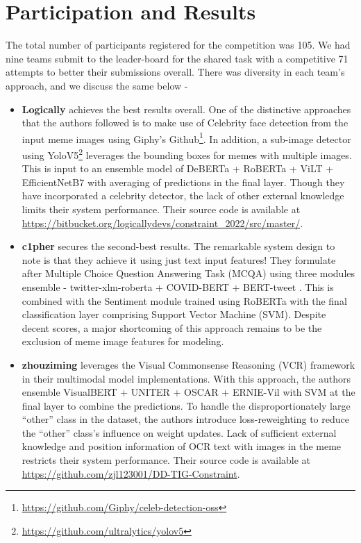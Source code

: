 \documentclass[11pt]{article}
\begin{document}



\section{Participation and Results}
\label{sec:partres}
The total number of participants registered for the competition was 105. We had nine teams submit to the leader-board for the shared task with a competitive 71 attempts to better their submissions overall. There was diversity in each team's approach, and we discuss the same below - 

\begin{itemize}
    \item \textbf{Logically} achieves the best results overall. One of the distinctive approaches that the authors followed is to make use of Celebrity face detection from the input meme images using Giphy's Github\footnote{\url{https://github.com/Giphy/celeb-detection-oss}}. In addition, a sub-image detector using YoloV5\footnote{\url{https://github.com/ultralytics/yolov5}} leverages the bounding boxes for memes with multiple images. This is input to an ensemble model of DeBERTa \citep{he_deberta_2021} + RoBERTa \citep{liu_roberta_2019} + ViLT \citep{kim_vilt_2021} + EfficientNetB7 \citep{tan_efficientnet_2020} with averaging of predictions in the final layer. Though they have incorporated a celebrity detector, the lack of other external knowledge limits their system performance. Their source code is available at \url{https://bitbucket.org/logicallydevs/constraint_2022/src/master/}.
    \item \textbf{c1pher} secures the second-best results. The remarkable system design to note is that they achieve it using just text input features! They formulate after Multiple Choice Question Answering Task (MCQA) using three modules ensemble - twitter-xlm-roberta + COVID-BERT \citep{muller_covid-twitter-bert_2020} + BERT-tweet \citep{nguyen_bertweet_2020}. This is combined with the Sentiment module trained using RoBERTa with the final classification layer comprising Support Vector Machine (SVM). Despite decent scores, a major shortcoming of this approach remains to be the exclusion of meme image features for modeling. 
    \item \textbf{zhouziming} leverages the Visual Commonsense Reasoning (VCR) framework in their multimodal model implementations. With this approach, the authors ensemble VisualBERT \citep{li_visualbert_2019} + UNITER \citep{chen_uniter_2020} + OSCAR \citep{li_oscar_2020} + ERNIE-Vil \citep{yu_ernie-vil_2021} with SVM at the final layer to combine the predictions. To handle the disproportionately large ``other'' class in the dataset, the authors introduce loss-reweighting to reduce the ``other'' class's influence on weight updates. Lack of sufficient external knowledge and position information of OCR text with images in the meme restricts their system performance. Their source code is available at \url{https://github.com/zjl123001/DD-TIG-Constraint}.

\end{itemize}
\end{document}
